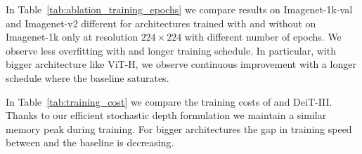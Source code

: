 


 
In Table~\ref{tab:ablation_training_epochs} we compare results on Imagenet-1k-val and Imagenet-v2 different for architectures trained with and without \ours on Imagenet-1k only at resolution $224\!\times\!224$ with different number of epochs.
We observe less overfitting with \ours and longer training schedule. In particular, with bigger architecture like ViT-H, we observe  continuous improvement with a longer schedule where the baseline saturates.

In Table~\ref{tab:training_cost} we compare the training costs of \ours and DeiT-III. 
Thanks to our efficient stochastic depth formulation we maintain a similar memory peak during  training. 
For  bigger architectures the gap in training speed between \ours and the baseline is decreasing.

\begin{table}
    \centering
    \vspace{-0.7em}
    \caption{Training times of different models trained at resolution $224\!\times\!224$ with batch size 2048 on Imagenet-1k with DeiT-III and our approach. 
    \ours uses our efficient stochastic depth (ESD), which amortizes the extra memory needed by \ours, especially for the largest models with  high stochastic depth values (0.45 for ViT-L, and 0.6 for ViT-H). 
    Timings are indicative and not representative of an optimized selection of the batch size. 
    \label{tab:training_cost}}
        \vspace{-0.5em}
\end{table}


